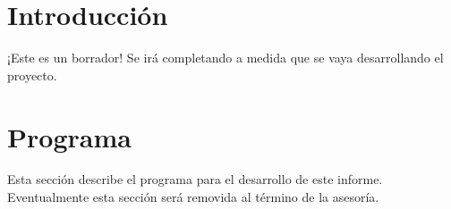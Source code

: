 \documentclass[letterpaper,titlepage]{article}
\begin{document}
\newpage

\tableofcontents

\newpage

\section{Introducción}

¡Este es un borrador! Se irá completando a medida que se vaya
desarrollando el proyecto.

\section{Programa}

Esta sección describe el programa para el desarrollo de este
informe. Eventualmente esta sección será removida al término de la
asesoría.
\end{document}
